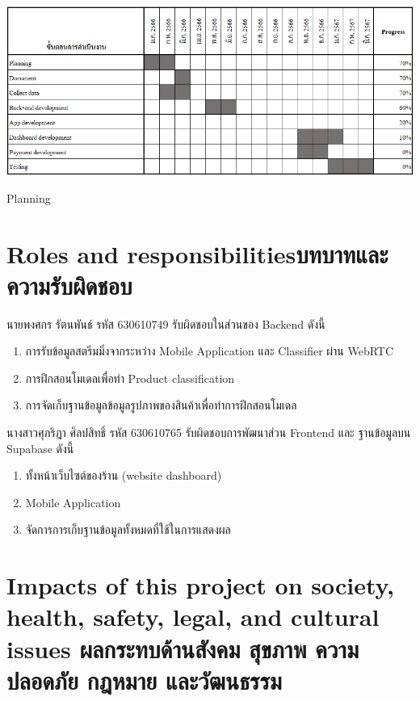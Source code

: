     \begin{table}[h]
        \begin{center}
        \vspace{0.5cm}\includegraphics[scale=0.64]{pic/plane.png}
        \end{center}
        
        \caption[Planning]{Planning}
        \label{table:Planning}
        \end{table}

\newpage
\section{\ifenglish Roles and responsibilities\else บทบาทและความรับผิดชอบ\fi}
นายพงศกร รัตนพันธ์ รหัส 630610749 รับผิดชอบในส่วนของ Backend ดังนี้

\begin{enumerate}
    \item การรับข้อมูลสตรีมมิ่งจากระหว่าง Mobile Application และ  Classifier ผ่าน WebRTC
    \item การฝึกสอนโมเดลเพื่อทำ Product classification
    \item การจัดเก็บฐานข้อมูลข้อมูลรูปภาพของสินค้าเพื่อทำการฝึกสอนโมเดล
\end{enumerate}


นางสาวศุภริฎา  ศิลปสิทธิ์ รหัส 630610765 รับผิดชอบการพัฒนาส่วน Frontend และ ฐานข้อมูลบน Supabase ดังนี้
\begin{enumerate}
    \item ทั้งหน้าเว็บไซต์ของร้าน (website dashboard) 
    \item Mobile Application
    \item จัดการการเก็บฐานข้อมูลทั้งหมดที่ใช้ในการแสดงผล
\end{enumerate}
\section{\ifenglish%
Impacts of this project on society, health, safety, legal, and cultural issues
\else%
ผลกระทบด้านสังคม สุขภาพ ความปลอดภัย กฎหมาย และวัฒนธรรม
\fi}


